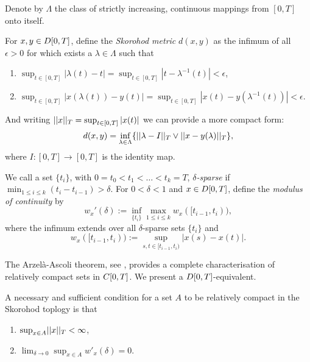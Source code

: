 \begin{definition} \label{D: skorohod}
	Denote by $\Lambda$ the class of strictly increasing, continuous mappings from $[0,T]$ onto itself.
	
	For $x, y \in D[0, T]$, define the \emph{Skorohod metric} $d(x,y)$ as the infimum of all $\epsilon > 0$ 
	for which exists a $\lambda \in \Lambda$ such that
	\begin{enumerate}
		\item $\sup_{t \in [0,T]}|\lambda (t) - t| = \sup_{t \in [0,T]}|t - \lambda^{-1}(t)| < \epsilon$,
		\item  $\sup_{t \in [0,T]}|x(\lambda (t)) - y(t)| = \sup_{t \in [0,T]}|x(t) - y(\lambda^{-1}(t))| < \epsilon$.
	\end{enumerate}
	And writing $||x||_T = \sup_{t \in [0,T]}|x(t)|$ we can provide a more compact form: \label{I: supnorm}
	\begin{equation}
		d(x,y) = \inf_{\lambda \in \Lambda}\{ ||\lambda - I||_T \vee ||x - y(\lambda)||_T \},
	\end{equation}
	where $I:[0,T] \rightarrow [0,T]$ is the identity map.
\end{definition}

\begin{definition} \label{D: modulus of continuity}
	We call a set $\{t_i\}$, with $ 0 = t_0 < t_1 < \dots < t_k = T $,
	\emph{$\delta$-sparse} if $\min_{1\leq i \leq k} (t_i - t_{i-1}) > \delta$.
	For $0 < \delta < 1$ and $x \in D[0, T]$, define the \emph{modulus of continuity} by
	\begin{equation*}
		w_x'(\delta) := \inf_{\{t_i\}} \max_{1\leq i \leq k} w_x([t_{i-1}, t_i)),
	\end{equation*}
	where the infimum extends over all $\delta$-sparse sets $\{t_i\}$ and
	\begin{equation*}
		w_x([t_{i-1}, t_i)) := \sup_{s,t \in [t_{i-1}, t_i)}|x(s)  -x(t)|.
	\end{equation*}
\end{definition}

The Arzelà-Ascoli theorem, see \cite[Theorem 7.2, p.82]{Billingsley.1999},
provides a complete character\-isation of relatively compact sets in $C[0, T]$.
We present a $D[0, T]$-equivalent.

\begin{theorem} \label{T: AA in DT}
	A necessary and sufficient condition for a set $A$ to be relatively compact in the Skorohod toplogy is that
	\begin{enumerate}
		\item $\sup_{x \in A} \norm{x}_T < \infty$,
		\item $\lim_{\delta \rightarrow 0} \sup_{x \in A} w'_x(\delta) = 0$.
	\end{enumerate}
\end{theorem}

